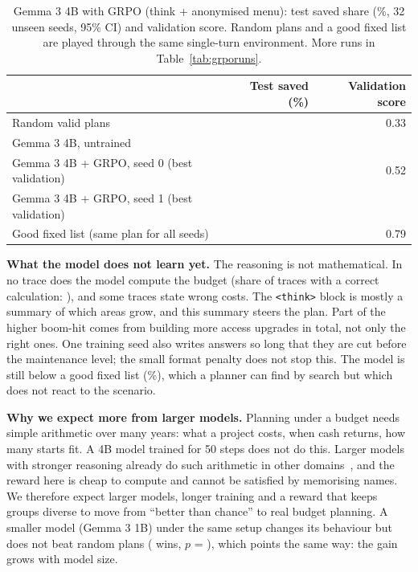 \documentclass{article}
\begin{document}
\begin{table}[t]
\caption{Gemma 3 4B with GRPO (think + anonymised menu): test saved share (\%, 32 unseen seeds, 95\% CI) and validation score. Random plans and a good fixed list are played through the same single-turn environment. More runs in Table~\ref{tab:grporuns}.}
\label{tab:grpo4b}
\centering\small
\begin{tabular}{@{}lrr@{}}
\toprule
 & Test saved (\%) & Validation score \\
\midrule
Random valid plans & \grpoRefRandomAnonTest{} & 0.33 \\
Gemma 3 4B, untrained & \grpoZeroFourThinkAnonTestFrac{} & \grpoFourThinkAnonScoreZero{} \\
Gemma 3 4B + GRPO, seed 0 (best validation) & \grpoFourThinkAnonTestBest{} & 0.52 \\
Gemma 3 4B + GRPO, seed 1 (best validation) & \grpoFourThinkAnonSeedOneTestBest{} & \grpoFourThinkAnonSeedOneScore{} \\
Good fixed list (same plan for all seeds) & \grpoRefConstAnonTest{} & 0.79 \\
\bottomrule
\end{tabular}
\end{table}

\textbf{What the model does not learn yet.} The reasoning is not mathematical. In no trace does the model compute the budget (share of traces with a correct calculation: \grpoFourThinkAnonArith{}), and some traces state wrong costs. The \texttt{<think>} block is mostly a summary of which areas grow, and this summary steers the plan. Part of the higher boom-hit comes from building more access upgrades in total, not only the right ones. One training seed also writes answers so long that they are cut before the maintenance level; the small format penalty does not stop this. The model is still below a good fixed list (\grpoRefConstAnonTest{}\%), which a planner can find by search but which does not react to the scenario.

\textbf{Why we expect more from larger models.} Planning under a budget needs simple arithmetic over many years: what a project costs, when cash returns, how many starts fit. A 4B model trained for 50 steps does not do this. Larger models with stronger reasoning already do such arithmetic in other domains~\cite{guo2025}, and the reward here is cheap to compute and cannot be satisfied by memorising names. We therefore expect larger models, longer training and a reward that keeps groups diverse to move from ``better than chance'' to real budget planning. A smaller model (Gemma 3 1B) under the same setup changes its behaviour but does not beat random plans (\grpoThinkAnonWinsRandomTest{} wins, $p$ = \grpoThinkAnonSignPRandomTest{}), which points the same way: the gain grows with model size.
\end{document}
